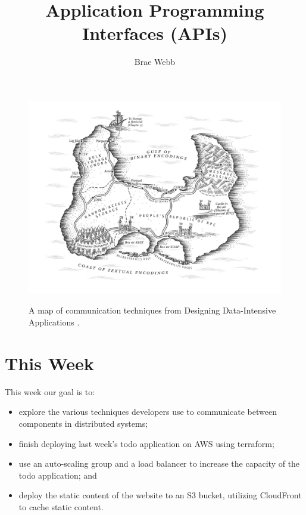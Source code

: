 \documentclass{csse4400}
\title{Application Programming Interfaces (APIs)}
\author{Brae Webb}
\date{\week{5}}
\begin{document}
\maketitle

\begin{figure}[h]
  \href{https://www.oreilly.com/library/view/designing-data-intensive-applications/9781491903063/ch04.html}{
    \includegraphics[width=\textwidth]{images/communication}
  }
\caption{A map of communication techniques from Designing Data-Intensive Applications \cite{data-intensive}.}
\end{figure}

\section{This Week}
This week our goal is to:
\begin{itemize}
  \item explore the various techniques developers use to communicate between components in distributed systems;
  \item finish deploying last week's todo application on AWS using terraform;
  \item use an auto-scaling group and a load balancer to increase the capacity of the todo application; and
  \item deploy the static content of the website to an S3 bucket, utilizing CloudFront to cache static content.
\end{itemize}

\end{document}
